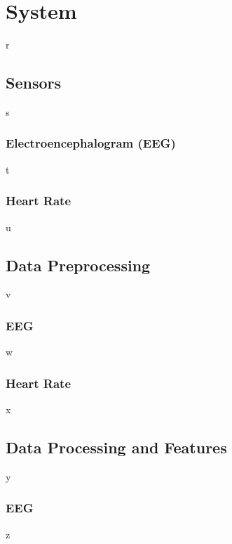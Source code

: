 \documentclass[11pt]{article}
\begin{document}
\section{System}
r
	\subsection{Sensors}
s		
		\subsubsection{Electroencephalogram (EEG)}
t			
		\subsubsection{Heart Rate}
u		
	\subsection{Data Preprocessing}
v	
		\subsubsection{EEG}
w			
		\subsubsection{Heart Rate}
x			
	\subsection{Data Processing and Features}
y	
		\subsubsection{EEG}
z			
\end{document}
